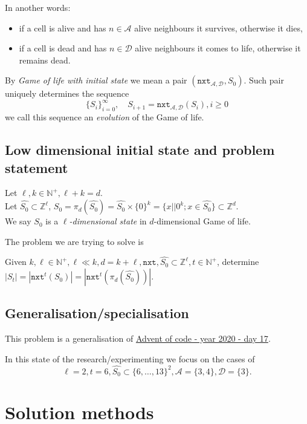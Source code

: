 \documentclass[]{article}
\newcommand{\NN}{\mathbb N}
\newcommand{\ZZ}{\mathbb Z}
\newcommand{\calA}{\mathcal A}
\newcommand{\calD}{\mathcal D}
\newcommand{\nxt}{\texttt{nxt}}
\begin{document}
	In another words:
	\begin{itemize}
		\item
		if a cell is alive and has $n \in \calA$ alive neighbours it survives, otherwise it dies,
		\item
		if a cell is dead and has $n \in \calD$ alive neighbours it comes to life, otherwise it remains dead.
	\end{itemize}
	
	By \emph{Game of life with initial state} we mean a pair $(\nxt_{\calA, \calD}, S_0)$. Such pair uniquely determines the sequence
	$$ \{S_i\}_{i=0}^\infty,\quad S_{i+1} = \nxt_{\calA, \calD}(S_i), i \geq 0$$
	we call this sequence an \emph{evolution} of the Game of life.
	
	\subsection{Low dimensional initial state and problem statement}
	
	Let $\ell,k \in \NN^+, \ell+k = d$.\\
	Let $\widehat{S_0} \subset \ZZ^\ell$, $S_0 = \pi_d(\widehat{S_0}) = \widehat{S_0} \times\{0\}^k = \{x||0^k; x \in \widehat{S_0}\} \subset \ZZ^d$.\\
	
	We say $S_0$ is a \emph{$\ell$-dimensional state} in $d$-dimensional Game of life.
	
	The problem we are trying to solve is
	
	\begin{center}
		Given $k, \ell \in \NN^+, \ell \ll k, d = k+\ell, \nxt, \widehat{S_0} \subset \ZZ^\ell, t \in \NN^+$, determine\\
		$|S_t| = |\nxt^t(S_0)| = |\nxt^t(\pi_d(\widehat{S_0}))|.$
	\end{center}
	
	\subsection{Generalisation/specialisation}
	This problem is a generalisation of \href{https://adventofcode.com/2020/day/17}{Advent of code - year 2020 - day 17}.
	
	In this state of the research/experimenting we focus on the cases of 
	$$\ell = 2, t=6, \widehat{S_0} \subset \{6,\dots,13\}^2, \calA = \{3,4\}, \calD = \{3\}.$$
	
	\newpage
	\section{Solution methods}
\end{document}
